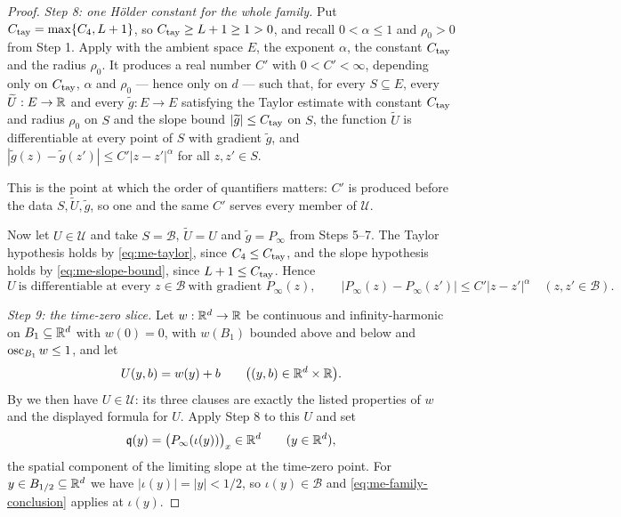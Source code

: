 \begin{proof}
\emph{Step 8: one H\"older constant for the whole family.}
Put $C_{\rm tay}=\max\{C_4,L+1\}$, so $C_{\rm tay}\ge L+1\ge1>0$, and recall
$0<\alpha\le1$ and $\rho_0>0$ from Step 1. Apply
 with the ambient space $E$, the exponent
$\alpha$, the constant $C_{\rm tay}$ and the radius $\rho_0$. It produces a real
number $C'$ with $0<C'<\infty$, depending only on $C_{\rm tay}$, $\alpha$ and
$\rho_0$ — hence only on $d$ — such that, for every $S\subseteq E$, every
$\widetilde U:E\to\mathbb{R}$ and every $\widetilde g:E\to E$ satisfying the Taylor
estimate with constant $C_{\rm tay}$ and radius $\rho_0$ on $S$ and the slope
bound $|\widetilde g|\le C_{\rm tay}$ on $S$, the function $\widetilde U$ is
differentiable at every point of $S$ with gradient $\widetilde g$, and
$|\widetilde g(z)-\widetilde g(z')|\le C'|z-z'|^\alpha$ for all $z,z'\in S$.

This is the point at which the order of quantifiers matters: $C'$ is produced
before the data $S,\widetilde U,\widetilde g$, so one and the same $C'$ serves
every member of $\mathcal U$.

Now let $U\in\mathcal U$ and take $S=\mathcal B$, $\widetilde U=U$ and
$\widetilde g=P_\infty$ from Steps 5--7. The Taylor hypothesis holds by
\eqref{eq:me-taylor}, since $C_4\le C_{\rm tay}$, and the slope hypothesis holds
by \eqref{eq:me-slope-bound}, since $L+1\le C_{\rm tay}$. Hence
\begin{equation}\label{eq:me-family-conclusion}
  U\ \text{is differentiable at every }z\in\mathcal B\ \text{with gradient }
  P_\infty(z),\qquad
  |P_\infty(z)-P_\infty(z')|\le C'|z-z'|^\alpha\quad(z,z'\in\mathcal B).
\end{equation}

\emph{Step 9: the time-zero slice.}
Let $w:\mathbb{R}^d\to\mathbb{R}$ be continuous and infinity-harmonic on $B_1\subseteq\mathbb{R}^d$ with
$w(0)=0$, with $w(B_1)$ bounded above and below and
$\operatorname{osc}_{B_1}w\le1$, and let
\[
  U(y,b)=w(y)+b\qquad\bigl((y,b)\in\mathbb{R}^d\times\mathbb{R}\bigr).
\]
By  we then have $U\in\mathcal U$: its three
clauses are exactly the listed properties of $w$ and the displayed formula for
$U$. Apply Step 8 to this $U$ and set
\[
  \mathfrak q(y)=\bigl(P_\infty(\iota(y))\bigr)_x\in\mathbb{R}^d\qquad(y\in\mathbb{R}^d),
\]
the spatial component of the limiting slope at the time-zero point. For
$y\in B_{1/2}\subseteq\mathbb{R}^d$ we have $|\iota(y)|=|y|<1/2$, so
$\iota(y)\in\mathcal B$ and \eqref{eq:me-family-conclusion} applies at
$\iota(y)$.


\end{proof}
